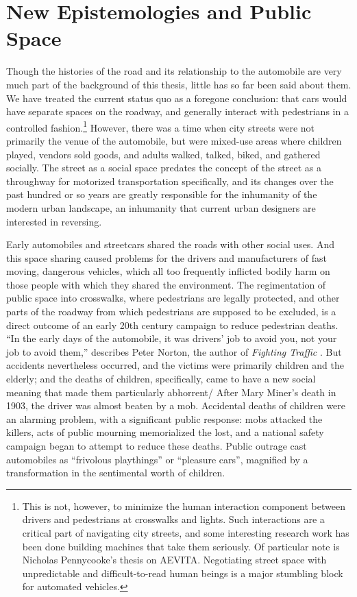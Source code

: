\chapter{New Epistemologies and Public Space}
\label{app:b}

Though the histories of the road and its relationship to the
automobile are very much part of the background of this thesis, little
has so far been said about them. We have treated the current status
quo as a foregone conclusion: that cars would have separate spaces on
the roadway, and generally interact with pedestrians in a controlled
fashion.\footnote{This is not, however, to minimize the human
  interaction component between drivers and pedestrians at crosswalks
  and lights. Such interactions are a critical part of navigating city
  streets, and some interesting research work has been done building
  machines that take them seriously. Of particular note is Nicholas
  Pennycooke's thesis on AEVITA\cite{???-aevita}. Negotiating street
  space with unpredictable and difficult-to-read human beings is a
  major stumbling block for automated vehicles.} However, there was a
time when city streets were not primarily the venue of the automobile,
but were mixed-use areas where children played, vendors sold goods,
and adults walked, talked, biked, and gathered socially. The street as
a social space predates the concept of the street as a throughway for
motorized transportation specifically, and its changes over the past
hundred or so years are greatly responsible for the inhumanity of the
modern urban landscape, an inhumanity that current urban designers are
interested in reversing. 

Early automobiles and streetcars shared the roads with other social
uses. And this space sharing caused problems for the drivers and
manufacturers of fast moving, dangerous vehicles, which all too
frequently inflicted bodily harm on those people with which they
shared the environment. The regimentation of public space into
crosswalks, where pedestrians are legally protected, and other parts
of the roadway from which pedestrians are supposed to be excluded, is
a direct outcome of an early 20th century campaign to reduce
pedestrian deaths. ``In the early days of the automobile, it was
drivers' job to avoid you, not your job to avoid them,'' describes
Peter Norton, the author of \emph{Fighting Traffic}
\cite{???-http://www.vox.com/2015/1/15/7551873/jaywalking-history}.
But accidents nevertheless occurred, and the victims were primarily
children and the elderly\cite{???-vox}; and the deaths of children,
specifically, came to have a new social meaning that made them
particularly abhorrent\cite{???-zelizer}/ 
After Mary Miner's death in 1903, the driver was almost beaten by a
mob\cite[p. 22]{???-zelizer}. Accidental deaths of children were an
alarming problem, with a significant public response:  mobs attacked
the killers, acts of public mourning memorialized the lost, and a
national safety campaign began to attempt to reduce these
deaths\cite[p. 23]{???-zelizer}. Public outrage cast automobiles as
``frivolous playthings'' or ``pleasure cars''\cite{???-vox}, magnified
by a transformation in the sentimental worth of
children\cite[p. 23]{???-zelizer}. 

